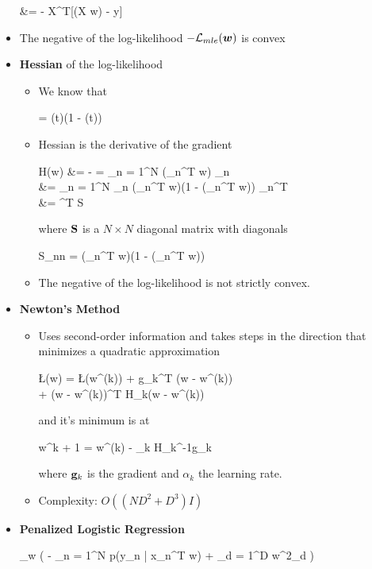 \begin{itemize}
\begin{myalign*}
	    &= - \*X^T[\sigma(\*X \bm w) - \*y]
	\end{myalign*}
	\item The negative of the log-likelihood $- \mathcal{L}_{mle}(\bm w)$ is convex
	\item \textbf{Hessian} of the log-likelihood
	\begin{itemize}
		\item We know that
		\begin{myalign*}
		     = \sigma(t)(1 - \sigma(t))
		\end{myalign*}
		\item Hessian is the derivative of the gradient
		\begin{myalign*}
		    \*H(\bm w) &= -   = \sum_{n = 1}^N  \sigma(_n^T \bm w) \tilde{\*x}_n\\
		    &= \sum_{n = 1}^N _n \sigma(_n^T \bm w)(1 - \sigma(_n^T \bm w)) _n^T\\
		    &= ^T \*S \tilde{\*X}
		\end{myalign*}
		where $\mathbf{S}$ is a $N \times N$ diagonal matrix with diagonals
		\begin{myalign*}
		    S_{nn} = \sigma(_n^T \bm w)(1 - \sigma(_n^T \bm w))
		\end{myalign*}
		\item The negative of the log-likelihood is not strictly convex.
	\end{itemize}
	\item \textbf{Newton's Method} %
	\begin{itemize}
		\item Uses second-order information and takes steps in the direction that minimizes a quadratic approximation
		\begin{myalign*}
		    \L(\bm w) = \L(\bm w^{(k)}) + \*g_k^T (\bm w - \bm w^{(k)})\\ + (\bm w - \bm w^{(k)})^T \*H_k(\bm w - \bm w^{(k)})
		\end{myalign*}
		and it's minimum is at
		\begin{myalign*}
		    \bm w^{k + 1} = \bm w^{(k)} - \alpha_k \*H_k^{-1}\*g_k
		\end{myalign*}
		where $\mathbf{g}_k$ is the gradient and $\alpha_k$ the learning rate.
		\item Complexity: $O((ND^2 + D^3)I)$
	\end{itemize}
	\item \textbf{Penalized Logistic Regression}
	\begin{myalign*}
	    \min_{\bm w} 
	    \left(
	    	- \sum_{n = 1}^N \log p(y_n | \*x_n^T \bm w) + \lambda \sum_{d = 1}^D w^2_d
	    \right)
	\end{myalign*}
\end{itemize}

